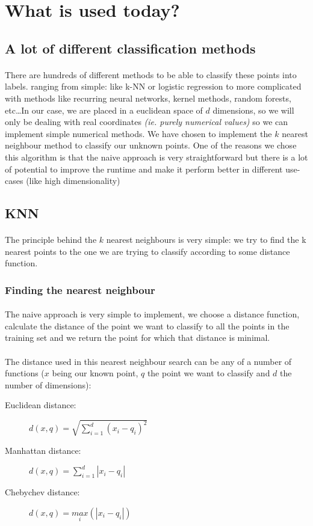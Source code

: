 \documentclass[11 pt]{article}
\begin{document}
\section{What is used today?}
\subsection{A lot of different classification methods}
\paragraph{}There are hundreds of different methods to be able to classify these points into labels. ranging from simple: like k-NN or logistic regression to more complicated with methods like recurring neural networks, kernel methods, random forests, etc\ldots In our case, we are placed in a euclidean space of $d$ dimensions, so we will only be dealing with real coordinates \emph{(ie. purely numerical values)} so we can implement simple numerical methods. We have chosen to implement the $k$ nearest neighbour method to classify our unknown points. One of the reasons we chose this algorithm is that the naive approach is very straightforward but there is a lot of potential to improve the runtime and make it perform better in different use-cases (like high dimensionality)

\subsection{KNN}
\paragraph{}The principle behind the $k$ nearest neighbours is very simple: we try to find the k nearest points to the one we are trying to classify according to some distance function.
\subsubsection{Finding the nearest neighbour}
\paragraph{}The naive approach is very simple to implement, we choose a distance function, calculate the distance of the point we want to classify to all the points in the training set and we return the point for which that distance is minimal.
\paragraph{}The distance used in this nearest neighbour search can be any of a number of functions ($x$ being our known point, $q$ the point we want to classify and $d$ the number of dimensions):
\begin{description}
  \item[Euclidean distance: ]$d(x,q)=\sqrt{\sum^d_{i=1}(x_i-q_i)^2}$
  \item[Manhattan distance: ]$d(x,q)=\sum^d_{i=1}|x_i-q_i|$
  \item[Chebychev distance: ]$d(x,q)=\underset{i}{max}(|x_i-q_i|)$
\end{description}
\end{document}
